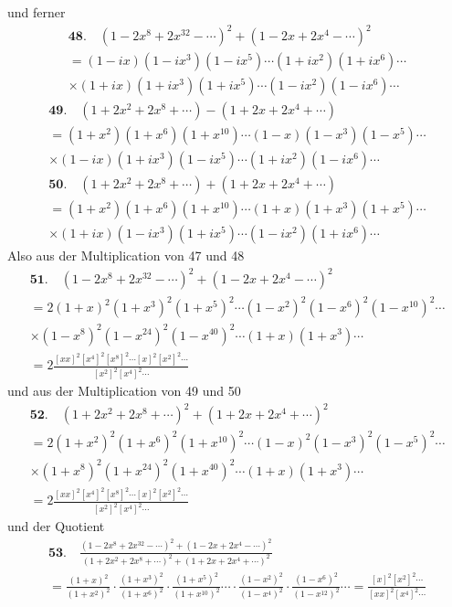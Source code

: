 \documentclass[10pt,a4paper]{article}
\begin{document}
\newpage

und ferner
%
\begin{multline*}
\textbf{48.} \quad (1 - 2x^8 + 2x^{32} - \cdots)^2 + (1 - 2x + 2x^4 - \cdots)^2 \\
= (1 - ix)(1 - ix^3)(1 - ix^5) \cdots (1 + ix^2)(1 + ix^6) \cdots \\
\times (1 + ix)(1 + ix^3)(1 + ix^5) \cdots (1 - ix^2)(1 - ix^6) \cdots
\end{multline*}
%
\begin{multline*}
\textbf{49.} \quad (1 + 2x^2 + 2x^8 + \cdots) - (1 + 2x + 2x^4 + \cdots) \\
= (1 + x^2)(1 + x^6)(1 + x^{10}) \cdots (1 - x)(1 - x^3)(1 - x^5) \cdots \\
\times (1 - ix)(1 + ix^3)(1 - ix^5) \cdots (1 + ix^2)(1 - ix^6) \cdots
\end{multline*}
%
\begin{multline*}
\textbf{50.} \quad (1 + 2x^2 + 2x^8 + \cdots) + (1 + 2x + 2x^4 + \cdots) \\
= (1 + x^2)(1 + x^6)(1 + x^{10}) \cdots (1 + x)(1 + x^3)(1 + x^5) \cdots \\
\times (1 + ix)(1 - ix^3)(1 + ix^5) \cdots (1 - ix^2)(1 + ix^6) \cdots
\end{multline*}
%
Also aus der Multiplication von 47 und 48
%
\begin{multline*}
\textbf{51.} \quad (1 - 2x^8 + 2x^{32} - \cdots)^2 + (1 - 2x + 2x^4 - \cdots)^2 \\
= 2(1 + x)^2(1 + x^3)^2(1 + x^5)^2 \cdots (1 - x^2)^2(1 - x^6)^2(1 - x^{10})^2 \cdots \\
\times (1 - x^8)^2(1 - x^{24})^2(1 - x^{40})^2 \cdots (1 + x)(1 + x^3) \cdots \\
= 2\frac{[xx]^2 [x^4]^2 [x^8]^2 \cdots [x]^2 [x^2]^2 \cdots}{[x^2]^2 [x^4]^2 \cdots}
\end{multline*}
%
und aus der Multiplication von 49 und 50
%
\begin{multline*}
\textbf{52.} \quad (1 + 2x^2 + 2x^8 + \cdots)^2 + (1 + 2x + 2x^4 + \cdots)^2 \\
= 2(1 + x^2)^2(1 + x^6)^2(1 + x^{10})^2 \cdots (1 - x)^2(1 - x^3)^2(1 - x^5)^2 \cdots \\
\times (1 + x^8)^2(1 + x^{24})^2(1 + x^{40})^2 \cdots (1 + x)(1 + x^3) \cdots \\
= 2\frac{[xx]^2 [x^4]^2 [x^8]^2 \cdots [x]^2 [x^2]^2 \cdots}{[x^2]^2 [x^4]^2 \cdots}
\end{multline*}
%
und der Quotient
%
\begin{multline*}
\textbf{53.} \quad
\frac{(1 - 2x^8 + 2x^{32} - \cdots)^2 + (1 - 2x + 2x^4 - \cdots)^2}
{(1 + 2x^2 + 2x^8 + \cdots)^2 + (1 + 2x + 2x^4 + \cdots)^2} \\
= \frac{(1 + x)^2}{(1 + x^2)^2} \cdot \frac{(1 + x^3)^2}{(1 + x^6)^2} \cdot \frac{(1 + x^5)^2}{(1 + x^{10})^2} \cdots
\cdot \frac{(1 - x^2)^2}{(1 - x^4)^2} \cdot \frac{(1 - x^6)^2}{(1 - x^{12})^2} \cdots
= \frac{[x]^2 [x^2]^2 \cdots}{[xx]^2 [x^4]^2 \cdots}
\end{multline*}
\end{document}

